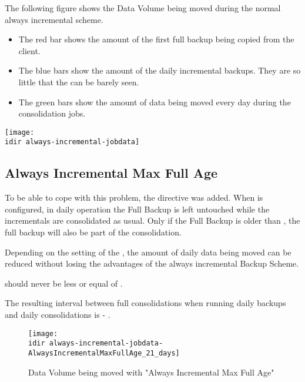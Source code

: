 The following figure shows the Data Volume being moved during the normal always incremental scheme.
\begin{itemize}
    \item The red bar shows the amount of the first full backup being copied from the client.
    \item The blue bars show the amount of the daily incremental backups. They are so little that the can be barely seen.
    \item The green bars show the amount of data being moved every day during the consolidation jobs.
\end{itemize}

\begin{center}
\texttt{[image: \\idir always-incremental-jobdata]}
\end{center}



\subsection{Always Incremental Max Full Age}
\label{sec:AlwaysIncrementalMaxFullAge}

To be able to cope with this problem, the directive  was added.
When  is configured,
in daily operation the Full Backup is left untouched while the incrementals are consolidated as usual. 
Only if the Full Backup is older than ,
the full backup will also be part of the consolidation.

Depending on the setting of the ,
the amount of daily data being moved can be reduced without losing the advantages of the always incremental Backup Scheme.

 should never be less or equal of .

The resulting interval between full consolidations when running daily backups
and daily consolidations is  - .

\begin{figure}[htbp]
\centering
\texttt{[image: \\idir always-incremental-jobdata-AlwaysIncrementalMaxFullAge\_21\_days]}
\caption{Data Volume being moved with "Always Incremental Max Full Age"}
\end{figure}%

